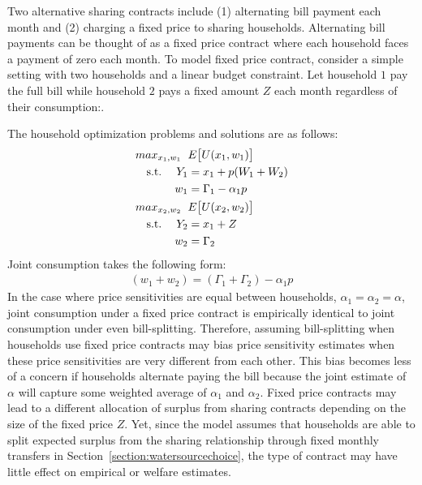 \documentclass[12pt]{article}
\begin{document}
\begin{appendices}
Two alternative sharing contracts include (1) alternating bill payment each month and (2) charging a fixed price to sharing households.  Alternating bill payments can be thought of as a fixed price contract where each household faces a payment of zero each month.  To model fixed price contract, consider a simple setting with two households and a linear budget constraint.  Let household $1$ pay the full bill while household $2$ pays a fixed amount $Z$ each month regardless of their consumption:.

The household optimization problems and solutions are as follows:
\begin{align*}
max_{x_1,w_1} \hspace{.2cm} & E\big[ U(x_1,w_1) \big] \\
\text{s.t.  }\hspace{.3cm} Y_1 &=   x_1  + p (W_1 + W_{2})  \\
w_1 &= \Gamma_1 - \alpha_1  p \\
max_{x_2,w_2} \hspace{.2cm} & E\big[ U(x_2,w_2) \big] \\
\text{s.t.  }\hspace{.3cm} Y_2 &=   x_1  + Z \\
w_2 &= \Gamma_2
\end{align*}
Joint consumption takes the following form:
\begin{align*}
(w_1+w_2) = (\Gamma_1 + \Gamma_2) - \alpha_1 p
\end{align*}
In the case where price sensitivities are equal between households, $\alpha_1=\alpha_2=\alpha$, joint consumption under a fixed price contract is empirically identical to joint consumption under even bill-splitting.  Therefore, assuming bill-splitting when households use fixed price contracts may bias price sensitivity estimates when these price sensitivities are very different from each other.  This bias becomes less of a concern if households alternate paying the bill because the joint estimate of $\alpha$ will capture some weighted average of $\alpha_1$ and $\alpha_2$.  Fixed price contracts may lead to a different allocation of surplus from sharing contracts depending on the size of the fixed price $Z$.  Yet, since the model assumes that households are able to split expected surplus from the sharing relationship through fixed monthly transfers in Section~\ref{section:watersourcechoice}, the type of contract may have little effect on empirical or welfare estimates.





\end{appendices}
\end{document}
